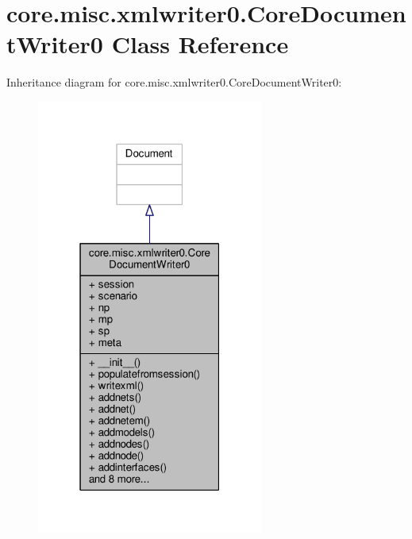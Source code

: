 \hypertarget{classcore_1_1misc_1_1xmlwriter0_1_1_core_document_writer0}{\section{core.\+misc.\+xmlwriter0.\+Core\+Document\+Writer0 Class Reference}
\label{classcore_1_1misc_1_1xmlwriter0_1_1_core_document_writer0}
}


Inheritance diagram for core.\+misc.\+xmlwriter0.\+Core\+Document\+Writer0\+:
\nopagebreak
\begin{figure}[H]
\begin{center}
\leavevmode
\includegraphics[width=211pt]{classcore_1_1misc_1_1xmlwriter0_1_1_core_document_writer0__inherit__graph}
\end{center}
\end{figure}


